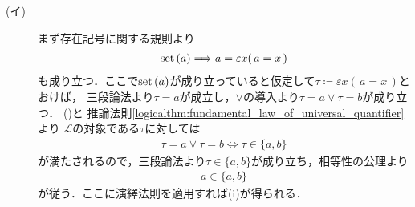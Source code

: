 	\begin{prf}\mbox{}
		\begin{description}
			\item[(イ)]
				まず存在記号に関する規則より
				\begin{align}
					\operatorname*{set} \left(a\right) \Longrightarrow a = \varepsilon x(\, a = x\, )
				\end{align}
				も成り立つ．ここで$\operatorname*{set} \left(a\right)$が成り立っていると仮定して$\tau \coloneqq \varepsilon x(\, a = x\, )$とおけば，
				三段論法より$\tau = a$が成立し，$\vee$の導入より$\tau = a \vee \tau = b$が成り立つ．
				()と
				推論法則\ref{logicalthm:fundamental_law_of_universal_quantifier}より
				$\mathcal{L}$の対象である$\tau$に対しては
				\begin{align}
					\tau = a \vee \tau = b \Longleftrightarrow \tau \in \{a,b\}
				\end{align}
				が満たされるので，三段論法より$\tau \in \{a,b\}$が成り立ち，相等性の公理より
				\begin{align}
					a \in \{a,b\}
				\end{align}
				が従う．ここに演繹法則を適用すれば(i)が得られる．
			

\end{description}
\end{prf}
